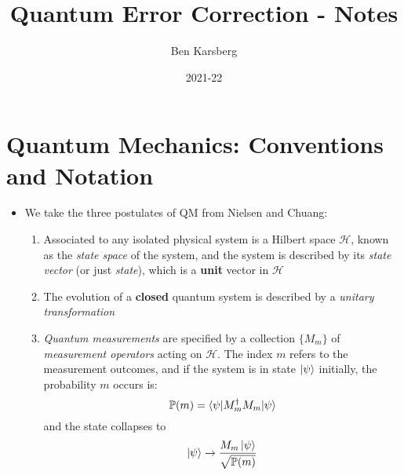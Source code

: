\documentclass[12pt,a4paper]{article}
\title{Quantum Error Correction - Notes}
\author{Ben Karsberg}
\date{2021-22}
\numberwithin{equation}{section}
\begin{document}
	\maketitle
	\section{Quantum Mechanics: Conventions and Notation}
	\begin{itemize}
		\item We take the three postulates of QM from Nielsen and Chuang:
		\begin{enumerate}
			\item Associated to any isolated physical system is a Hilbert space $\mathcal{H}$, known as the \textit{state space} of the system, and the system is described by its \textit{state vector} (or just \textit{state}), which is a \textbf{unit} vector in $\mathcal{H}$
			\item The evolution of a \textbf{closed} quantum system is described by a \textit{unitary transformation}
			\item \textit{Quantum measurements} are specified by a collection $\{M_{m}\}$ of \textit{measurement operators} acting on $\mathcal{H}$. The index $m$ refers to the measurement outcomes, and if the system is in state $\ket{\psi}$ initially, the probability $m$ occurs is:
			$$
				\mathbb{P}(m)=\braket{\psi|M_{m}^{\dagger}M_{m}|\psi}
			$$
			and the state collapses to
			$$ \label{Measurement postulate}
				\ket{\psi}\to\frac{M_{m}\ket{\psi}}{\sqrt{\mathbb{P}(m)}}
			$$
		\end{enumerate}
	\end{itemize}
\end{document}
